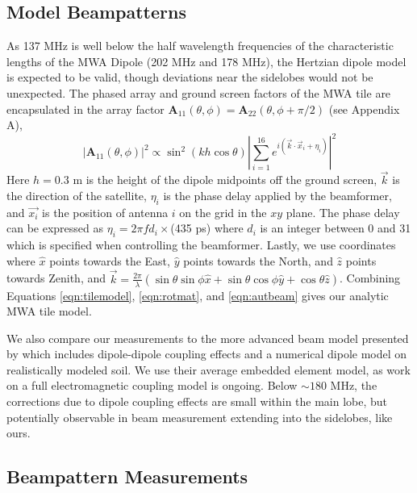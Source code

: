 \subsection{Model Beampatterns}
\label{sec:modelbeampatterns}

As 137 MHz is well below the half wavelength frequencies of the characteristic lengths of the MWA Dipole (202 MHz and 178 MHz), the Hertzian dipole model is expected to be valid, though deviations near the sidelobes would not be unexpected. The phased array and ground screen factors of the MWA tile are encapsulated in the array factor $\textbf{A}_{11}(\theta,\phi)=\textbf{A}_{22}(\theta,\phi+\pi/2)$ (see Appendix A),
\begin{equation}
\label{eqn:tilemodel}
|\textbf{A}_{11}(\theta,\phi)|^2 \propto \sin^2\left(kh\cos\theta\right)\left|\sum_{i=1}^{16}e^{i (\vec{k}\cdot \vec{x}_i+\eta_i)}\right|^2
\end{equation}
Here $h=0.3$ m is the height of the dipole midpoints off the ground screen, $\vec{k}$ is the direction of the satellite, $\eta_i$ is the phase delay applied by the beamformer, and $\vec{x_i}$ is the position of antenna $i$ on the grid in the $xy$ plane. The phase delay can be expressed as $\eta_i=2\pi fd_i\times$(435 ps) where $d_i$ is an integer between 0 and 31 which is specified when controlling the beamformer. Lastly, we use coordinates where $\hat{x}$ points towards the East, $\hat{y}$ points towards the North, and $\hat{z}$ points towards Zenith, and $\vec{k}=\frac{2\pi}{\lambda}(\sin\theta\sin\phi\hat{x}+\sin\theta\cos\phi\hat{y}+\cos\theta\hat{z})$. Combining Equations \ref{eqn:tilemodel}, \ref{eqn:rotmat}, and \ref{eqn:autbeam} gives our analytic MWA tile model. 

We also compare our measurements to the more advanced beam model presented by \citet{sutinjo2015} which includes dipole-dipole coupling effects and a numerical dipole model on realistically modeled soil. We use their average embedded element model, as work on a full electromagnetic coupling model is ongoing. Below $\sim180$ MHz, the corrections due to dipole coupling effects are small within the main lobe, but potentially observable in beam measurement extending into the sidelobes, like ours.

\subsection{Beampattern Measurements}

